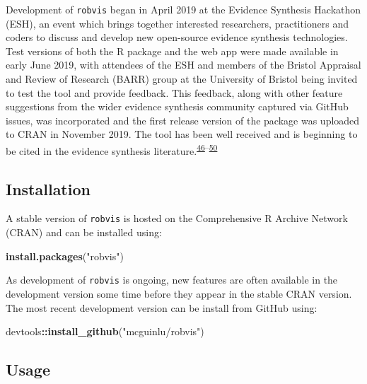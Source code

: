 \documentclass[a4paper, twoside]{templates/ociamthesis}
\newenvironment{Shaded}{\begin{snugshade}}{\end{snugshade}}
\newcommand{\KeywordTok}[1]{\textcolor[rgb]{0.13,0.29,0.53}{\textbf{#1}}}
\newcommand{\NormalTok}[1]{#1}
\newcommand{\OperatorTok}[1]{\textcolor[rgb]{0.81,0.36,0.00}{\textbf{#1}}}
\newcommand{\StringTok}[1]{\textcolor[rgb]{0.31,0.60,0.02}{#1}}
\renewenvironment{Shaded}
{
  \vspace{4pt}%
  \begin{snugshade}%
}{%
  \end{snugshade}%
  \vspace{4pt}%
}
\begin{document}
Development of \texttt{robvis} began in April 2019 at the Evidence Synthesis Hackathon (ESH), an event which brings together interested researchers, practitioners and coders to discuss and develop new open-source evidence synthesis technologies. Test versions of both the R package and the web app were made available in early June 2019, with attendees of the ESH and members of the Bristol Appraisal and Review of Research (BARR) group at the University of Bristol being invited to test the tool and provide feedback. This feedback, along with other feature suggestions from the wider evidence synthesis community captured via GitHub issues, was incorporated and the first release version of the package was uploaded to CRAN in November 2019. The tool has been well received and is beginning to be cited in the evidence synthesis literature.\textsuperscript{\protect\hyperlink{ref-gibb2019consistent}{46}--\protect\hyperlink{ref-tanneru2020}{50}}

\hypertarget{installation}{%
\subsection{Installation}\label{installation}}

A stable version of \texttt{robvis} is hosted on the Comprehensive R Archive Network (CRAN) and can be installed using:

\begin{Shaded}
\begin{Highlighting}[]
\KeywordTok{install.packages}\NormalTok{(}\StringTok{"robvis"}\NormalTok{)}
\end{Highlighting}
\end{Shaded}

As development of \texttt{robvis} is ongoing, new features are often available in the development version some time before they appear in the stable CRAN version. The most recent development version can be install from GitHub using:

\begin{Shaded}
\begin{Highlighting}[]
\NormalTok{devtools}\OperatorTok{::}\KeywordTok{install_github}\NormalTok{(}\StringTok{"mcguinlu/robvis"}\NormalTok{)}
\end{Highlighting}
\end{Shaded}

\hypertarget{usage}{%
\subsection{Usage}\label{usage}}
\end{document}
